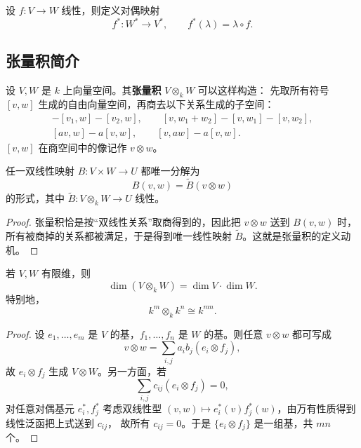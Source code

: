 \begin{definition}[对偶映射]
设 $f\colon V\to W$ 线性，则定义对偶映射
\begin{equation}
  f^*\colon W^*\to V^*,
  \qquad
  f^*(\lambda)=\lambda\circ f.
\end{equation}
\end{definition}

\subsection{张量积简介}

\begin{definition}[张量积]
设 $V,W$ 是 $k$ 上向量空间。其\textbf{张量积} $V\otimes_k W$ 可以这样构造：
先取所有符号 $[v,w]$ 生成的自由向量空间，再商去以下关系生成的子空间：
\begin{align}
  [v_1+v_2,w]-[v_1,w]-[v_2,w], \qquad
  [v,w_1+w_2]-[v,w_1]-[v,w_2], \\
  [av,w]-a[v,w], \qquad [v,aw]-a[v,w].
\end{align}
$[v,w]$ 在商空间中的像记作 $v\otimes w$。
\end{definition}

\begin{proposition}[万有性质]
任一双线性映射 $B\colon V\times W\to U$ 都唯一分解为
\begin{equation}
  B(v,w)=\widetilde{B}(v\otimes w)
\end{equation}
的形式，其中 $\widetilde{B}\colon V\otimes_k W\to U$ 线性。
\end{proposition}

\begin{proof}
张量积恰是按“双线性关系”取商得到的，因此把 $v\otimes w$ 送到 $B(v,w)$ 时，
所有被商掉的关系都被满足，于是得到唯一线性映射 $\widetilde{B}$。这就是张量积的定义动机。
\end{proof}

\begin{proposition}
若 $V,W$ 有限维，则
\begin{equation}
  \dim(V\otimes_k W)=\dim V\cdot \dim W.
\end{equation}
特别地，
\begin{equation}
  k^m\otimes_k k^n\cong k^{mn}.
\end{equation}
\end{proposition}

\begin{proof}
设 $e_1,\dots,e_m$ 是 $V$ 的基，$f_1,\dots,f_n$ 是 $W$ 的基。则任意 $v\otimes w$ 都可写成
\[
  v\otimes w = \sum_{i,j} a_i b_j (e_i\otimes f_j),
\]
故 $e_i\otimes f_j$ 生成 $V\otimes W$。另一方面，若
\[
  \sum_{i,j} c_{ij}(e_i\otimes f_j)=0,
\]
对任意对偶基元 $e_i^*,f_j^*$ 考虑双线性型
$(v,w)\mapsto e_i^*(v)f_j^*(w)$，由万有性质得到线性泛函把上式送到 $c_{ij}$，
故所有 $c_{ij}=0$。于是 $\{e_i\otimes f_j\}$ 是一组基，共 $mn$ 个。
\end{proof}


